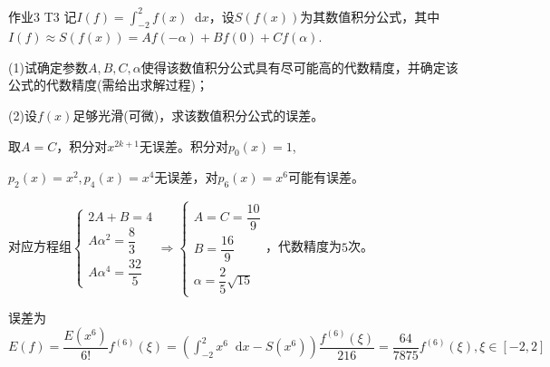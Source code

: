 \documentclass[10pt]{beamer}
\newcommand*{\diff}{\mathop{}\!\mathrm{d}}
\begin{document}
    \begin{frame}{作业3 T3}
        记$I(f)=\int_{-2}^2 f(x)\diff x$，设$S(f(x))$为其数值积分公式，其中$I(f)\approx S(f(x))=Af(-\alpha)+Bf(0)+Cf(\alpha)$.\vspace{0.08cm}

        (1)试确定参数$A,B,C,\alpha$使得该数值积分公式具有尽可能高的代数精度，并确定该公式的代数精度(需给出求解过程)；

        (2)设$f(x)$足够光滑(可微)，求该数值积分公式的误差。

        \pause 取$A=C$，积分对$x^{2k+1}$无误差。积分对$p_0(x)=1$,

        \pause $p_2(x)=x^2,p_4(x)=x^4$无误差，对$p_6(x)=x^6$可能有误差。

        \pause 对应方程组$\begin{cases}2A+B=4\\A\alpha^2=\dfrac83\\A\alpha^4=\dfrac{32}5\end{cases}\Longrightarrow\begin{cases}A=C=\dfrac{10}9\\B=\dfrac{16}9\\\alpha=\dfrac25\sqrt{15}\end{cases}$，代数精度为$5$次。

        \pause 误差为$E(f)=\dfrac{E(x^6)}{6!}f^{(6)}(\xi)=\left(\int_{-2}^2 x^6\diff x-S(x^6)\right)\dfrac{f^{(6)}(\xi)}{216}=\dfrac{64}{7875} f^{(6)}(\xi),\xi\in[-2,2]$
    \end{frame}
\end{document}
